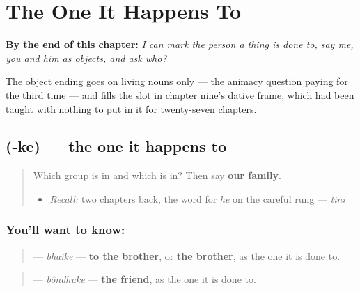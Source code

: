 
\chapter{The One It Happens To}
\label{ch:bn-the-one-it-happens-to}

\begin{chapteropening}
\textbf{By the end of this chapter:} \emph{I can mark the person a thing is done to, say me, you and him as objects, and ask who?}

The object ending goes on living nouns only — the animacy question paying for the third time — and fills the slot in chapter nine's dative frame, which had been taught with nothing to put in it for twenty-seven chapters.
\end{chapteropening}

\section[\texorpdfstring{\bn{কে} (-ke)}{কে (-ke)}]{ (-ke) — the one it happens to}

\label{lesson:BN-C25-ke-suffix}



\begin{quote}
Which group is \textbf{} in and which is \textbf{} in? Then say \textbf{our family}.

\begin{itemize}
\raggedright
  \item \emph{Recall:} two chapters back, the word for \emph{he} on the careful rung — \emph{tini}
\end{itemize}
\end{quote}

\subsection*{You'll want to know: }
\begin{quote}
\textbf{} — \emph{bhāike} — \textbf{to the brother}, or \textbf{the brother}, as the one it is done to.
\end{quote}

\begin{quote}
\textbf{} — \emph{bôndhuke} — \textbf{the friend}, as the one it is done to.
\end{quote}


